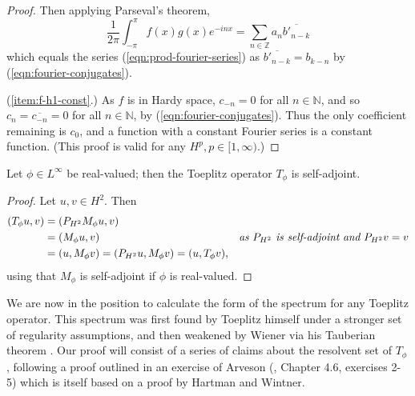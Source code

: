 \documentclass[../main.tex]{subfiles}
\begin{document}
\begin{proof}
  Then applying Parseval's theorem,
  $$\frac{1}{2\pi} \int_{-\pi}^{\pi} f(x) g(x) e^{-inx} = \sum_{n \in \mathbb{Z}}a_n \overline{b'_{n-k}}$$
  which equals the series (\ref{eqn:prod-fourier-series}) as $\overline{b'_{n-k}} = b_{k-n}$ by (\ref{eqn:fourier-conjugates}).


(\ref{item:f-h1-const}.) As $f$ is in Hardy space, $c_{-n} = 0$ for all $n \in \mathbb{N}$, and so $c_n =
  \overline{c_{-n}} = 0$ for all $n \in \mathbb{N}$, by (\ref{eqn:fourier-conjugates}).
  Thus the only coefficient remaining is $c_0$, and a function with a constant Fourier series
  is a constant function. (This proof is valid for any $H^p, p \in [1, \infty)$.)
\end{proof}

\begin{lemma}
\label{thm:toeplitz-self-adjoint}
  Let $\phi \in L^\infty$ be real-valued; then the Toeplitz operator $T_\phi$ is self-adjoint. 
\end{lemma}
\begin{proof}
Let $u, v \in H^2$. Then 
\begin{align*}
(T_\phi u, v) & = ( P_{H^2}M_\phi u, v) & \\
& = (M_\phi u, v) & \text{\emph{as $P_{H^2}$ is self-adjoint and $P_{H^2}v = v$}}\\
& = (u, M_\phi v) = (P_{H^2}u, M_\phi v) = (u, T_\phi v),
\end{align*}
using that $M_\phi$ is self-adjoint if $\phi$ is real-valued.
\end{proof}

We are now in the position to calculate the form of the spectrum for any
Toeplitz operator. This spectrum was first found by Toeplitz himself under a
stronger set of regularity assumptions, and then weakened by Wiener via his
Tauberian theorem \parencite{schmidt1960toeplitz}.
Our proof will consist of a series of claims about the resolvent set of
$T_\phi$, following a proof outlined in an exercise of Arveson
(\parencite{arveson2002short}, Chapter 4.6, exercises 2-5) which is itself based
on a proof by Hartman and Wintner.
\end{document}
